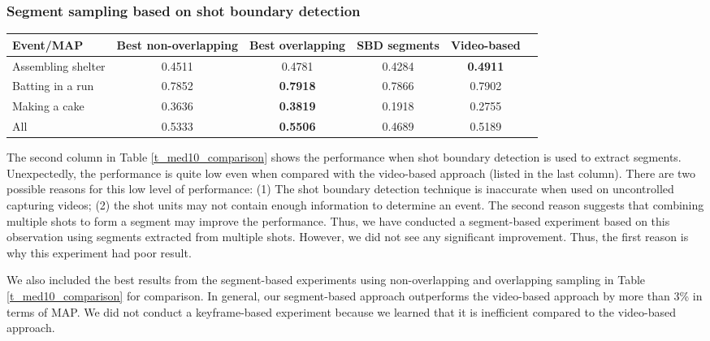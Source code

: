 \subsubsection{Segment sampling based on shot boundary detection}
\label{experimentalresult:3}
\begin{table*}
	\renewcommand{\arraystretch}{1.3}
	\caption{Comparison of different segment-based approaches with the video-based approach on the MED 2010 dataset.}
	\label{t_med10_comparison}
	\centering
	\begin{tabular}{|l|ccc|c|c|}
		\hline
		Event/MAP & Best non-overlapping & Best overlapping & SBD segments & Video-based\\
		\hline
		Assembling shelter & 0.4511 & 0.4781& 0.4284  & \textbf{0.4911} \\
		\hline
		Batting in a run & 0.7852 &\textbf{0.7918}& 0.7866 & 0.7902 \\
		\hline
		Making a cake & 0.3636 & \textbf{0.3819} & 0.1918 & 0.2755 \\
		\hline
		All & 0.5333 & \textbf{0.5506} & 0.4689 & 0.5189 \\
		\hline
	\end{tabular}
\end{table*}

The second column in Table \ref{t_med10_comparison} shows the performance when shot boundary detection is used to extract segments. Unexpectedly, the performance is quite low even when compared with the video-based approach (listed in the last column). There are two possible reasons for this low level of performance: (1) The shot boundary detection technique is inaccurate when used on uncontrolled capturing videos; (2) the shot units may not contain enough information to determine an event. The second reason suggests that combining multiple shots to form a segment may improve the performance. Thus, we have conducted a segment-based experiment based on this observation using segments extracted from multiple shots. However, we did not see any significant improvement. Thus, the first reason is why this experiment had poor result.

We also included the best results from the segment-based experiments using non-overlapping and overlapping sampling in Table \ref{t_med10_comparison} for comparison. In general, our segment-based approach outperforms the video-based approach by more than 3\% in terms of MAP. We did not conduct a keyframe-based experiment because we learned that it is inefficient compared to the video-based approach.

